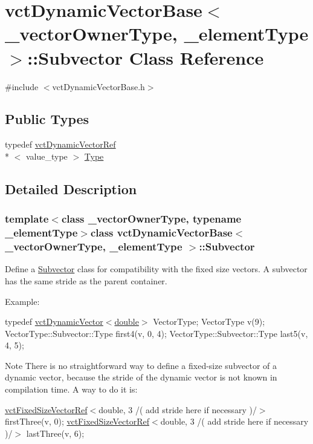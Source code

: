 \hypertarget{classvct_dynamic_vector_base_1_1_subvector}{\section{vct\-Dynamic\-Vector\-Base$<$ \-\_\-vector\-Owner\-Type, \-\_\-element\-Type $>$\-:\-:Subvector Class Reference}
\label{classvct_dynamic_vector_base_1_1_subvector}
}


{\ttfamily \#include $<$vct\-Dynamic\-Vector\-Base.\-h$>$}

\subsection*{Public Types}
\begin{DoxyCompactItemize}
\item 
typedef \hyperlink{classvct_dynamic_vector_ref}{vct\-Dynamic\-Vector\-Ref}\\*
$<$ value\-\_\-type $>$ \hyperlink{classvct_dynamic_vector_base_1_1_subvector_a39712115ee3599cf1d241395f1ec645a}{Type}
\end{DoxyCompactItemize}


\subsection{Detailed Description}
\subsubsection*{template$<$class \-\_\-vector\-Owner\-Type, typename \-\_\-element\-Type$>$class vct\-Dynamic\-Vector\-Base$<$ \-\_\-vector\-Owner\-Type, \-\_\-element\-Type $>$\-::\-Subvector}

Define a \hyperlink{classvct_dynamic_vector_base_1_1_subvector}{Subvector} class for compatibility with the fixed size vectors. A subvector has the same stride as the parent container.

Example\-:

typedef \hyperlink{classvct_dynamic_vector}{vct\-Dynamic\-Vector$<$double$>$} Vector\-Type; Vector\-Type v(9); Vector\-Type\-::\-Subvector\-::\-Type first4(v, 0, 4); Vector\-Type\-::\-Subvector\-::\-Type last5(v, 4, 5);

\begin{DoxyNote}{Note}
There is no straightforward way to define a fixed-\/size subvector of a dynamic vector, because the stride of the dynamic vector is not known in compilation time. A way to do it is\-:
\end{DoxyNote}
\hyperlink{classvct_fixed_size_vector_ref}{vct\-Fixed\-Size\-Vector\-Ref}$<$double, 3 /( add stride here if necessary )/$>$ first\-Three(v, 0); \hyperlink{classvct_fixed_size_vector_ref}{vct\-Fixed\-Size\-Vector\-Ref}$<$double, 3 /( add stride here if necessary )/$>$ last\-Three(v, 6); 

